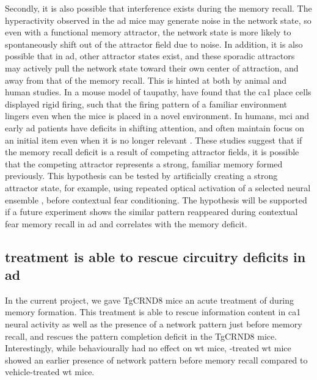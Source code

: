 Secondly, it is also possible that interference exists during the memory recall. The hyperactivity observed in the \gls{ad} mice may generate noise in the network state, so even with a functional memory attractor, the network state is more likely to spontaneously shift out of the attractor field due to noise. In addition, it is also possible that in \gls{ad}, other attractor states exist, and these sporadic attractors may actively pull the network state toward their own center of attraction, and away from that of the memory recall. This is hinted at both by animal and human studies. In a mouse model of taupathy, \citet{cheng13} have found that the \gls{ca1} place cells displayed rigid firing, such that the firing pattern of a familiar environment lingers even when the mice is placed in a novel environment. In humans, \gls{mci} and early \gls{ad} patients have deficits in shifting attention, and often maintain focus on an initial item even when it is no longer relevant \citep{perry99}. These studies suggest that if the memory recall deficit is a result of competing attractor fields, it is possible that the competing attractor represents a strong, familiar memory formed previously. This hypothesis can be tested by artificially creating a strong attractor state, for example, using repeated optical activation of a selected neural ensemble \citep{carrillo-reid16}, before contextual fear conditioning. The hypothesis will be supported if a future experiment shows the similar pattern reappeared during contextual fear memory recall in \gls{ad} and correlates with the memory deficit. 

\subsection{\tglu{} treatment is able to rescue circuitry deficits in \gls{ad}}

In the current project, we gave TgCRND8 mice an acute treatment of \tglu{} during memory formation. This treatment is able to rescue information content in \gls{ca1} neural activity as well as the presence of a network pattern just before memory recall, and rescues the pattern completion deficit in the TgCRND8 mice. Interestingly, while behaviourally \tglu{} had no effect on \gls{wt} mice, \tglu-treated \gls{wt} mice showed an earlier presence of network pattern before memory recall compared to vehicle-treated \gls{wt} mice. 


